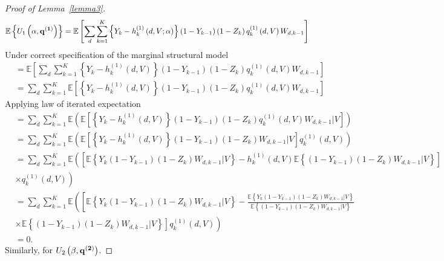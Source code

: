 \documentclass[12pt]{article}
\begin{document}
\begin{proof}[Proof of Lemma~\ref{lemma3}]
\begin{equation*}
\mathbb{E} \left\lbrace U_1 \left( \alpha, \bf{q^{(1)}} \right) \right\rbrace = \mathbb{E} \left[ \sum_d \sum_{k=1}^{K} \left\lbrace Y_{k} - h_k^{(1)} \left(d, V; \alpha \right) \right\rbrace \left( 1 - Y_{k-1} \right) \left( 1 - Z_{k} \right) q_k^{(1)} \left(d, V \right) W_{d,k-1} \right] 
\end{equation*}
Under correct specification of the marginal structural model
\begin{align*}
&= \mathbb{E} \left[ \sum_d \sum_{k=1}^{K} \left\lbrace Y_{k} - h_{k}^{(1)} \left(d, V \right) \right\rbrace \left( 1 - Y_{k-1} \right) \left( 1 - Z_{k} \right) q_k^{(1)} \left(d, V \right) W_{d,k-1} \right] \\
&= \sum_d \sum_{k=1}^{K} \mathbb{E} \left[ \left\lbrace Y_{k} - h_k^{(1)} \left(d, V \right) \right\rbrace \left( 1 - Y_{k-1} \right) \left( 1 - Z_{k} \right) q_k^{(1)} \left(d, V \right) W_{d,k-1} \right]
\end{align*}
Applying law of iterated expectation
\begin{align*}
&= \sum_d \sum_{k=1}^{K} \mathbb{E} \left( \mathbb{E} \left[ \left\lbrace Y_{k} - h_k^{(1)} \left(d, V \right) \right\rbrace \left( 1 - Y_{k-1} \right) \left( 1 - Z_{k} \right) q_k^{(1)} \left(d, V \right) W_{d,k-1} \vert  V \right] \right) \\
&= \sum_d \sum_{k=1}^{K} \mathbb{E} \left( \mathbb{E} \left[ \left\lbrace Y_{k} - h_k^{(1)} \left(d, V \right) \right\rbrace \left( 1 - Y_{k-1} \right) \left( 1 - Z_{k} \right) W_{d,k-1} \vert  V \right] q_k^{(1)} \left(d, V \right) \right) \\
&= \sum_d \sum_{k=1}^{K} \mathbb{E} \left( \left[ \mathbb{E} \left\lbrace Y_{k} \left( 1 - Y_{k-1} \right) \left( 1 - Z_{k} \right) W_{d,k-1} \vert  V \right\rbrace - h_k^{(1)} \left(d, V \right) \mathbb{E} \left\lbrace \left( 1 - Y_{k-1} \right) \left( 1 - Z_{k} \right) W_{d,k-1} \vert  V \right\rbrace \right] \right. \\
&\left. \times q_k^{(1)} \left(d, V \right) \right) \\
&= \sum_d \sum_{k=1}^{K} \mathbb{E} \left( \left[ \mathbb{E} \left\lbrace Y_{k} \left( 1 - Y_{k-1} \right) \left( 1 - Z_{k} \right) W_{d,k-1} \vert  V \right\rbrace  - \frac{\mathbb{E} \left\lbrace Y_{k} \left( 1 - Y_{k-1} \right) \left( 1 - Z_{k} \right) W_{d,k-1} \vert  V \right\rbrace}{\mathbb{E} \left\lbrace \left( 1 - Y_{k-1} \right) \left( 1 - Z_{k} \right) W_{d,k-1} \vert  V \right\rbrace} \right. \right.\\
&\left. \left.\times \mathbb{E} \left\lbrace \left( 1 - Y_{k-1} \right) \left( 1 - Z_{k} \right) W_{d,k-1} \vert  V \right\rbrace \right] q_k^{(1)} \left(d, V \right) \right) \\
&= 0. 
\end{align*}
Similarly, for $U_2 \left( \beta, \bf{q^{(2)}} \right)$. 
\end{proof}
\end{document}
